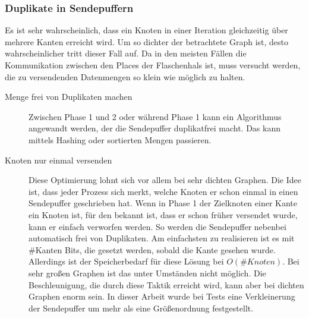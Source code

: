 \subsubsection{Duplikate in Sendepuffern} %
\label{sub:duplikate_in_sendepuffern}
Es ist sehr wahrscheinlich, dass ein Knoten in einer Iteration gleichzeitig über mehrere Kanten erreicht wird. Um so dichter der betrachtete Graph ist, desto wahrscheinlicher tritt dieser Fall auf. Da in den meisten Fällen die Kommunikation zwischen den Places der Flaschenhals ist, muss versucht werden, die zu versendenden Datenmengen so klein wie möglich zu halten. 
\begin{description}
	\item[Menge frei von Duplikaten machen] Zwischen Phase 1 und 2 oder während Phase 1 kann ein Algorithmus angewandt werden, der die Sendepuffer duplikatfrei macht. Das kann mittels Hashing oder sortierten Mengen passieren.
	\item[Knoten nur einmal versenden] Diese Optimierung lohnt sich vor allem bei sehr dichten Graphen. Die Idee ist, dass jeder Prozess sich merkt, welche Knoten er schon einmal in einen Sendepuffer geschrieben hat. Wenn in Phase 1 der Zielknoten einer Kante ein Knoten ist, für den bekannt ist, dass er schon früher versendet wurde, kann er einfach verworfen werden. So werden die Sendepuffer nebenbei automatisch frei von Duplikaten. Am einfachsten zu realisieren ist es mit \#Kanten Bits, die gesetzt werden, sobald die Kante gesehen wurde. Allerdings ist der Speicherbedarf für diese Lösung bei $O(\# Knoten)$. Bei sehr großen Graphen ist das unter Umständen nicht möglich. Die Beschleunigung, die durch diese Taktik erreicht wird, kann aber bei dichten Graphen enorm sein. In dieser Arbeit wurde bei Tests eine Verkleinerung der Sendepuffer um mehr als eine Größenordnung festgestellt.
\end{description}

